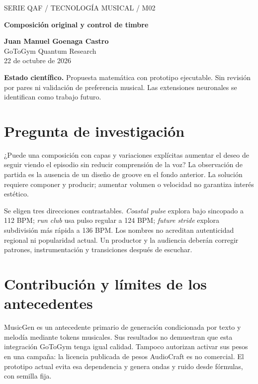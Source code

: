 \documentclass[11pt,a4paper]{article}
\begin{document}
\begin{center}{\sffamily\small\textcolor{mint}{SERIE QAF / TECNOLOGÍA MUSICAL / M02}}\par\vspace{8pt}
{\sffamily\LARGE\bfseries\textcolor{ink}{Composición original y control de timbre}}\par\vspace{10pt}
\textbf{Juan Manuel Goenaga Castro}\\GoToGym Quantum Research\\22 de octubre de 2026
\end{center}
\colorbox{ink!6}{\parbox{.96\linewidth}{\small\textbf{Estado científico.} Propuesta matemática con prototipo ejecutable. Sin revisión por pares ni validación de preferencia musical. Las extensiones neuronales se identifican como trabajo futuro.}}
\begin{abstract}
Se propone un motor por capas para sustituir el fondo ambiental uniforme por composiciones editables con batería, bajo, armonía y motivo. La implementación produce tres bocetos DSP originales y reproducibles, sin descargar muestras ni pesos. Se formaliza además una futura extensión neuronal condicionada por estilo, energía y narrativa. La síntesis ejecutada no se presenta como ese modelo entrenado: es una referencia funcional para audición y para construir contratos de control antes de invertir en datos y entrenamiento.
\end{abstract}
\section{Pregunta de investigación}
¿Puede una composición con capas y variaciones explícitas aumentar el deseo de seguir viendo el episodio sin reducir comprensión de la voz? La observación de partida es la ausencia de un diseño de groove en el fondo anterior. La solución requiere componer y producir; aumentar volumen o velocidad no garantiza interés estético.

Se eligen tres direcciones contrastables. \emph{Coastal pulse} explora bajo sincopado a 112 BPM; \emph{run club} usa pulso regular a 124 BPM; \emph{future stride} explora subdivisión más rápida a 136 BPM. Los nombres no acreditan autenticidad regional ni popularidad actual. Un productor y la audiencia deberán corregir patrones, instrumentación y transiciones después de escuchar.
\section{Contribución y límites de los antecedentes}
MusicGen es un antecedente primario de generación condicionada por texto y melodía mediante tokens musicales. Sus resultados no demuestran que esta integración GoToGym tenga igual calidad. Tampoco autorizan activar sus pesos en una campaña: la licencia publicada de pesos AudioCraft es no comercial. El prototipo actual evita esa dependencia y genera ondas y ruido desde fórmulas, con semilla fija.
\end{document}
